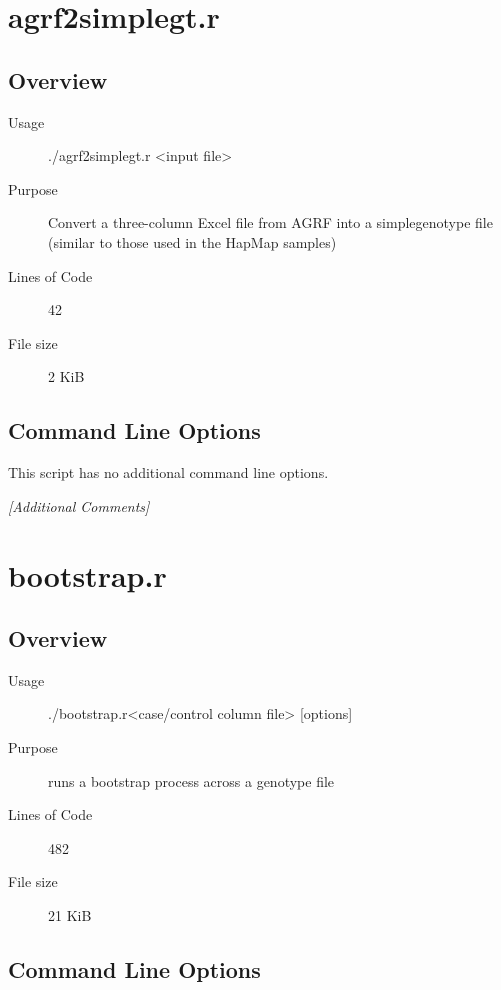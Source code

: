 \section{agrf2simplegt.r}
\label{sec:agrf2simplegt.r}

\subsection{Overview}
\label{sec:agrf2simplegt.r-overview}

\begin{description}
\item[Usage] ./agrf2simplegt.r <input file>
\item[Purpose] Convert a three-column Excel file from AGRF into a simplegenotype file (similar to those used in the HapMap samples)
\item[Lines of Code] 42
\item[File size] 2 KiB
\end{description}

\subsection{Command Line Options}
\label{sec:agrf2simplegt.r-command-line}

This script has no additional command line options.

\emph{[Additional Comments]}

\section{bootstrap.r}
\label{sec:bootstrap.r}

\subsection{Overview}
\label{sec:bootstrap.r-overview}

\begin{description}
\item[Usage] ./bootstrap.r<case/control column file> [options]
\item[Purpose] runs a bootstrap process across a genotype file
\item[Lines of Code] 482
\item[File size] 21 KiB
\end{description}

\subsection{Command Line Options}
\label{sec:bootstrap.r-command-line}


